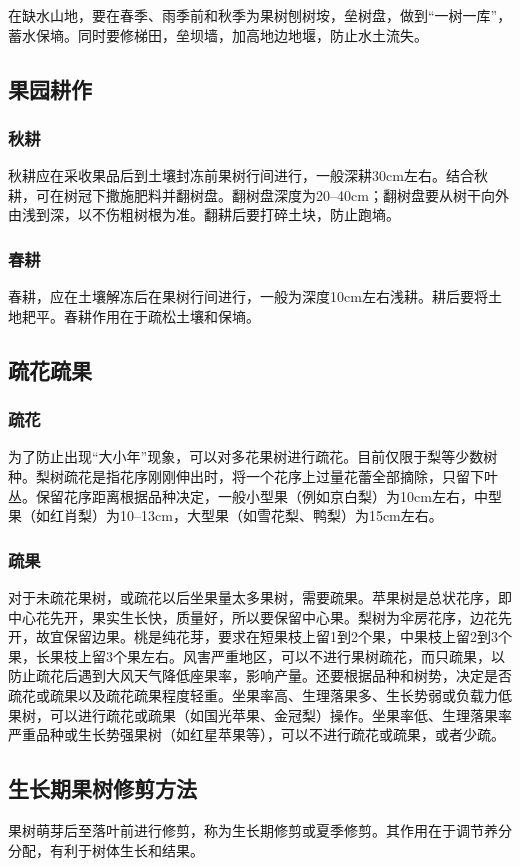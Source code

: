 \documentclass{ctexbook}
\begin{document}
在缺水山地，要在春季、雨季前和秋季为果树刨树垵，垒树盘，做到“一树一库”，蓄水保墒。同时要修梯田，垒坝墙，加高地边地堰，防止水土流失。
\subsection{果园耕作}
\subsubsection{秋耕}
秋耕应在采收果品后到土壤封冻前果树行间进行，一般深耕30cm左右。结合秋耕，可在树冠下撒施肥料并翻树盘。翻树盘深度为20--40cm；翻树盘要从树干向外由浅到深，以不伤粗树根为准。翻耕后要打碎土块，防止跑墒。
\subsubsection{春耕}
春耕，应在土壤解冻后在果树行间进行，一般为深度10cm左右浅耕。耕后要将土地耙平。春耕作用在于疏松土壤和保墒。
\subsection{疏花疏果}
\subsubsection{疏花}
为了防止出现“大小年”现象，可以对多花果树进行疏花。目前仅限于梨等少数树种。梨树疏花是指花序刚刚伸出时，将一个花序上过量花蕾全部摘除，只留下叶丛。保留花序距离根据品种决定，一般小型果（例如京白梨）为10cm左右，中型果（如红肖梨）为10--13cm，大型果（如雪花梨、鸭梨）为15cm左右。
\subsubsection{疏果}
对于未疏花果树，或疏花以后坐果量太多果树，需要疏果。苹果树是总状花序，即中心花先开，果实生长快，质量好，所以要保留中心果。梨树为伞房花序，边花先开，故宜保留边果。桃是纯花芽，要求在短果枝上留1到2个果，中果枝上留2到3个果，长果枝上留3个果左右。风害严重地区，可以不进行果树疏花，而只疏果，以防止疏花后遇到大风天气降低座果率，影响产量。还要根据品种和树势，决定是否疏花或疏果以及疏花疏果程度轻重。坐果率高、生理落果多、生长势弱或负载力低果树，可以进行疏花或疏果（如国光苹果、金冠梨）操作。坐果率低、生理落果率严重品种或生长势强果树（如红星苹果等），可以不进行疏花或疏果，或者少疏。
\subsection{生长期果树修剪方法}
果树萌芽后至落叶前进行修剪，称为生长期修剪或夏季修剪。其作用在于调节养分分配，有利于树体生长和结果。
\end{document}
